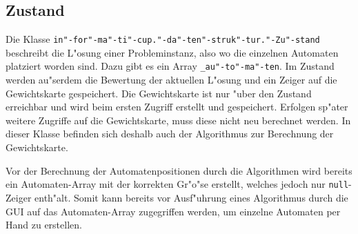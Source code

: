 \subsection{Zustand}
Die Klasse \texttt{in"-for"-ma"-ti"-cup."-da"-ten"-struk"-tur."-Zu"-stand} beschreibt die L"osung einer Probleminstanz, also wo die einzelnen Automaten platziert worden sind. Dazu gibt es ein Array \texttt{\_au"-to"-ma"-ten}. Im Zustand werden au"serdem die Bewertung der aktuellen L"osung und ein Zeiger auf die Gewichtskarte gespeichert. Die Gewichtskarte ist nur "uber den Zustand erreichbar und wird beim ersten Zugriff erstellt und gespeichert. Erfolgen sp"ater weitere Zugriffe auf die Gewichtskarte, muss diese nicht neu berechnet werden. In dieser Klasse befinden sich deshalb auch der Algorithmus zur Berechnung der Gewichtskarte. 

Vor der Berechnung der Automatenpositionen durch die Algorithmen wird bereits ein Automaten-Array mit der korrekten Gr"o"se erstellt, welches jedoch nur \texttt{null}-Zeiger enth"alt. Somit kann bereits vor Ausf"uhrung eines Algorithmus durch die GUI auf das Automaten-Array zugegriffen werden, um einzelne Automaten per Hand zu erstellen. 

